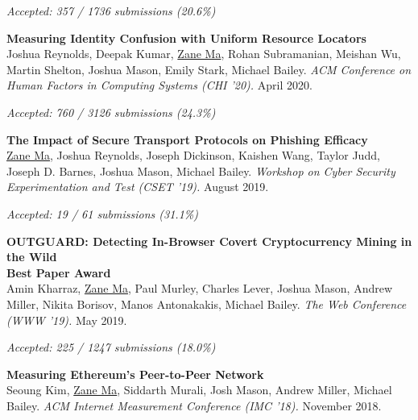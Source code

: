 \documentclass[10pt,singlecolumn]{article} %
\begin{document}
{\raggedleft\textit{Accepted: 357 / 1736 submissions (20.6\%)}\par}
\vspace{6pt}


\textbf{Measuring Identity Confusion with Uniform Resource Locators}\\
Joshua Reynolds, Deepak Kumar, \underline{Zane Ma}, Rohan Subramanian, Meishan Wu, Martin Shelton, Joshua Mason, Emily Stark, Michael Bailey.
\textit{ACM Conference on Human Factors in Computing Systems (CHI '20).} April 2020.

{\raggedleft\textit{Accepted: 760 / 3126 submissions (24.3\%)}\par}
\vspace{6pt}


\textbf{The Impact of Secure Transport Protocols on Phishing Efficacy}\\
\underline{Zane Ma}, Joshua Reynolds, Joseph Dickinson, Kaishen Wang, Taylor Judd, Joseph D. Barnes, Joshua Mason, Michael Bailey.
\textit{Workshop on Cyber Security Experimentation and Test (CSET '19).} August 2019.

{\raggedleft\textit{Accepted: 19 / 61 submissions (31.1\%)}\par}
\vspace{6pt}


\textbf{OUTGUARD: Detecting In-Browser Covert Cryptocurrency Mining in the Wild}\\
    \textbf{\color{headings}Best Paper Award}\\
Amin Kharraz, \underline{Zane Ma}, Paul Murley, Charles Lever, Joshua Mason, Andrew Miller,
Nikita Borisov, Manos Antonakakis, Michael Bailey. 
\textit{The Web Conference (WWW '19).} May 2019.

{\raggedleft\textit{Accepted: 225 / 1247 submissions (18.0\%)}\par}
\vspace{6pt}


\textbf{Measuring Ethereum's Peer-to-Peer Network}\\
Seoung Kim, \underline{Zane Ma}, Siddarth Murali, Josh Mason, Andrew Miller, Michael Bailey.
\textit{ACM Internet Measurement Conference (IMC '18).} November 2018.
\end{document}
